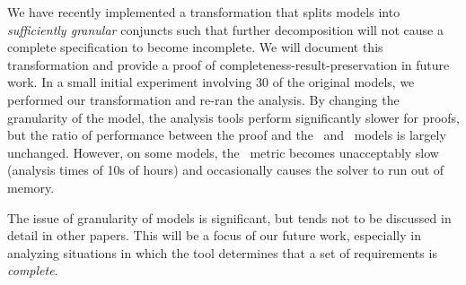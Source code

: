 %
We have recently implemented a transformation that splits models into {\em sufficiently granular} conjuncts such that further decomposition will not cause a complete specification to become incomplete.  We will document this transformation and provide a proof of completeness-result-preservation in future work.
%
In a small initial experiment involving 30 of the original models, we performed our transformation and re-ran the analysis.  By changing the granularity of the model, the analysis tools perform significantly slower for proofs, but the ratio of performance between the proof and the \ucalg\ and \nondetcovalt\ models is largely unchanged.  However, on some models, the \nondetcovalt\ metric becomes unacceptably slow (analysis times of 10s of hours) and occasionally causes the solver to run out of memory.

The issue of granularity of models is significant, but tends not to be discussed in detail in other papers.  This will be a focus of our future work, especially in analyzing situations in which the tool determines that a set of requirements is {\em complete}.

